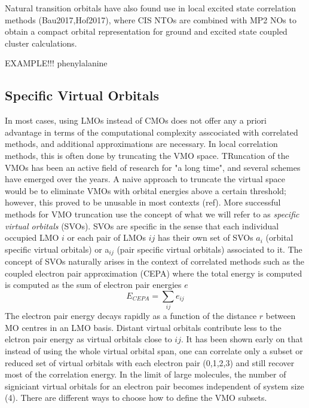 Natural transition orbitals have also found use in local excited  state correlation methods (Bau2017,Hof2017), where CIS NTOs are combined with MP2 NOs to obtain a compact orbital representation for ground and excited state coupled cluster calculations.

EXAMPLE!!! phenylalanine







\subsection{Specific Virtual Orbitals}

In most cases, using LMOs instead of CMOs does not offer any a priori advantage in terms of the computational complexity asscociated with correlated methods, and additional approximations are necessary. In local correlation methods, this is often done by truncating the VMO space. TRuncation of the VMOs has been an active field of research for "a long time", and several schemes have emerged over the years. A naive approach to truncate the virtual space would be to eliminate VMOs with orbital energies above a certain threshold; however, this proved to be unusable in most contexts (ref). More successful methods for VMO truncation use the concept of what we will refer to as \emph{specific virtual orbitals} (SVOs). SVOs are specific in the sense that each individual occupied LMO $i$ or each pair of LMOs $ij$ has their own set of SVOs $a_i$ (orbital specific virtual orbitals) or a$_{ij}$ (pair specific virtual orbitals) associated to it.
The concept of SVOs naturally arises in the context of correlated methods such as the coupled electron pair approximation (CEPA) where the total energy is computed is computed as the sum of electron pair energies $e$
\begin{equation}
E_{CEPA} = \sum_{ij} e_{ij}
\end{equation}
The electron pair energy decays rapidly as a function of the distance $r$ between MO centres in an LMO basis. Distant virtual orbitals contribute less to the elctron pair energy as virtual orbitals close to ${ij}$. It has been shown early on that instead of using the whole virtual orbital span, one can correlate only a subset or reduced set of virtual orbitals with each electron pair (0,1,2,3) and still recover most of the correlation energy. In the limit of large molecules, the number of signiciant virtual orbitals for an electron pair becomes independent of system size (4). There are different ways to choose how to define the VMO subsets.

